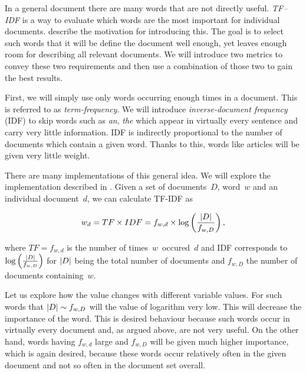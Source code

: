 In a general document there are many words that are not directly useful.
{\it TF--IDF} is a way to evaluate which words are the most important for individual documents.  
\citet{SalBuc88} describe the motivation for introducing this.
The goal is to select such words that it will be define the document well enough, yet leaves enough room for describing all relevant documents.
We will introduce two metrics to convey these two requirements and then use a combination of those two to gain the best results.

First, we will simply use only words occurring enough times in a document. This is referred to as {\it term-frequency}.
We will introduce {\it inverse-document frequency} (IDF) to skip words such as {\it an}, {\it the} which appear in virtually every sentence and carry very little information.
IDF is indirectly proportional to the number of documents which contain a given word.
Thanks to this, words like articles will be given very little weight.

There are many implementations of this general idea. We will explore the implementation described in \citet{Ramos03}. Given a set of documents~$D$, word~$w$ and an individual document~$d$,
we can calculate TF-IDF as

\[
	w_d = TF \times IDF = f_{w, d} \times \log \left( \frac{\left|{D}\right|}{f_{w,D}}  \right),
\]

where $TF = f_{w, d}$ is the number of times~$w$~occured~$d$ and IDF corresponds to $\log \left( \frac{\left|{D}\right|}{f_{w,D}}  \right)$ for $\left|{D}\right|$ being the total number of documents and $f_{w, D}$ the number of documents containing~$w$.

Let us explore how the value changes with different variable values. For such words that $\left|{D}\right| \sim f_{w, D}$ will the value of logarithm very low. This will decrease the importance of the word. This is desired behaviour because such words occur in virtually every document and, as argued above, are not very useful. On the other hand, words having $f_{w,d}$ large and $f_{w,D}$ will be given much higher importance, which is again desired, because these words occur relatively often in the given document and not so often in the document set overall.




